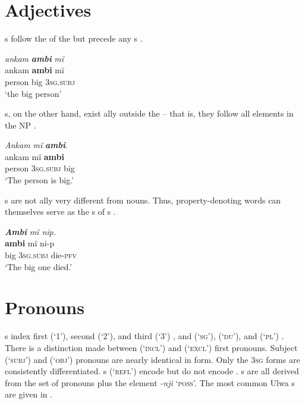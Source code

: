 
\section{Adjectives}\label{sec:overview:2.5}


s follow the  of the  but precede any s .

\ea%
    \label{ex:overview:36}
    \textit{ankam} \textbf{\textit{ambi}} \textit{mï}\\
\gll    ankam    \textbf{ambi}  mï\\
    person    big    3\textsc{sg.subj}\\
\glt    ‘the big person’
\z

s, on the other hand, exist ally outside the  -- that is, they follow all elements in the NP .

\ea%
    \label{ex:overview:37}
    \textit{Ankam mï} \textbf{\textit{ambi}}.\\
\gll    ankam    mï      \textbf{ambi}\\
    person    3\textsc{sg.subj}  big\\
\glt    ‘The person is big.’
\z

s are not ally very different from nouns. Thus, property-denoting words can themselves serve as the s of s .


\ea%
    \label{ex:overview:38}
    \textbf{\textit{Ambi}} \textit{mï nip.}\\
\gll    \textbf{ambi}  mï      ni-p\\
    big    3\textsc{sg.subj}  die-\textsc{pfv}\\
\glt    ‘The big one died.’
\z

\section{Pronouns}\label{sec:overview:2.6}


s index first (‘1’), second (‘2’), and third (‘3’) , and  (‘\textsc{sg}’),  (‘\textsc{du}’), and  (‘\textsc{pl}’) . There is a distinction made between  (‘\textsc{incl}’) and  (‘\textsc{excl}’)  first  pronouns. Subject (‘\textsc{subj}’) and  (‘\textsc{obj}’) pronouns are nearly identical in form. Only the 3\textsc{sg} forms are consistently differentiated.  s (‘\textsc{refl}’) encode  but do not encode . s are all derived from the set of  pronouns plus the element \textit{{}-nji} ‘\textsc{poss}’. The most common Ulwa s are given in .

